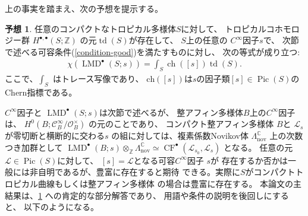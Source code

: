\documentclass[uplatex,dvipdfmx,12pt]{jsarticle}
\numberwithin{equation}{section}
\theoremstyle{definition}
\newtheorem{conjecture}[theorem]{予想}
\newcommand{\opn}[1]{\operatorname{#1}}
\begin{document}

上の事実を踏まえ、次の予想を提示する。

\begin{conjecture} \label{conjecture-mirror-tropical-rr}
任意のコンパクトなトロピカル多様体$S$に対して、
トロピカルコホモロジー群 $H^{\bullet,\bullet}(S;\mathbb{Z})$
の元$\opn{td}(S)$が存在して、
$S$上の任意の
$C^{\infty}$因子$s$で、
次節で述べる可容条件(\cref{condition-good})を満たすものに対し、
次の等式が成り立つ:
\begin{align}
\chi(\opn{LMD}^{\bullet}(S;s))=
\int_{S}\opn{ch}([s])\opn{td}(S).
\end{align}
ここで、$\int_S$ はトレース写像であり、
$\mathrm{ch}([s])$は$s$の因子類$[s]\in \opn{Pic}(S)$の 
Chern指標である。
\end{conjecture}
$C^{\infty}$因子と
$\opn{LMD}^{\bullet}(S;s)$は次節で述べるが、
整アフィン多様体$B$上の$C^{\infty}$因子は、
$H^{0}(B;\mathcal{C}_{B}^{\infty}/\mathcal{O}^{\times}_B)$
の元のことであり、
コンパクト整アフィン多様体 $B$と
$\mathscr{L}_s$が零切断と横断的に交わる$s$
の組に対しては、複素係数Novikov体 
$\Lambda^{\mathbb{C}}_{\mathrm{nov}}$
上の次数つき加群として
$\opn{LMD}^{\bullet}(B;s)\otimes_{\mathbb{Z}}
\Lambda^{\mathbb{C}}_{\mathrm{nov}}\simeq
\opn{CF}^{\bullet}(\mathscr{L}_{s_0},
\mathscr{L}_s)$ となる。
任意の元$\mathcal{L}\in\opn{Pic}(S)$に対して、
$[s]=\mathcal{L}$となる可容$C^{\infty}$因子
$s$が
存在するか否かは一般には非自明であるが、豊富に存在すると期待
できる。実際に$S$がコンパクトトロピカル曲線もしくは整アフィン多様体
の場合は豊富に存在する。
本論文の主結果は、\cref{conjecture-mirror-tropical-rr}
への肯定的な部分解答であり、
用語や条件の説明を後回しにすると、
以下のようになる。
\end{document}
